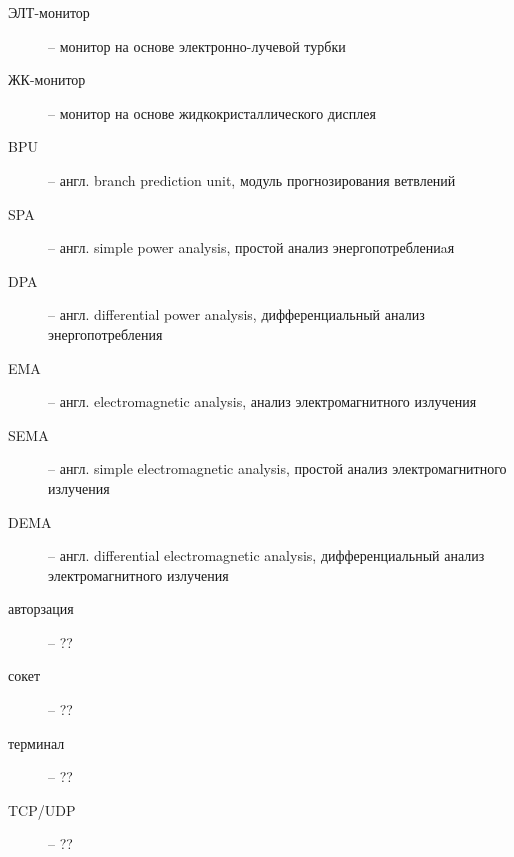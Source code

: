 
\begin{description}
\item[ЭЛТ-монитор] -- монитор на основе электронно-лучевой турбки
\item[ЖК-монитор] -- монитор на основе жидкокристаллического дисплея
\item[BPU] -- англ. branch prediction unit, модуль прогнозирования ветвлений
\item[SPA] -- англ. simple power analysis, простой анализ энергопотреблениaя
\item[DPA] -- англ. differential power analysis, дифференциальный анализ
  энергопотребления
\item[EMA] -- англ. electromagnetic analysis, анализ электромагнитного
  излучения
\item[SEMA] -- англ. simple electromagnetic analysis, простой анализ
  электромагнитного излучения
\item[DEMA] -- англ. differential electromagnetic analysis, дифференциальный
  анализ электромагнитного излучения
\end{description}

\clearpage


\begin{description}
\item[авторзация] -- ??
\item[сокет] -- ??
\item[терминал] -- ??
\item[TCP/UDP] -- ??
\end{description}

\clearpage
